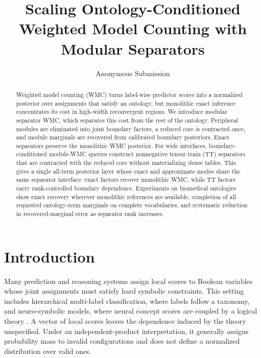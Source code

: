 \documentclass[letterpaper]{article}
\title{Scaling Ontology-Conditioned Weighted Model Counting with Modular Separators}
\author{
    Anonymous Submission
}
\begin{document}
\maketitle

\begin{abstract}
Weighted model counting (WMC) turns label-wise predictor scores into a
normalized posterior over assignments that satisfy an ontology, but
monolithic exact inference concentrates its cost in high-width
reconvergent regions. We introduce modular separator WMC, which separates
this cost from the rest of the ontology. Peripheral modules are eliminated
into joint boundary factors, a reduced core is contracted once, and module
marginals are recovered from calibrated boundary posteriors. Exact
separators preserve the monolithic WMC posterior. For wide interfaces,
boundary-conditioned module-WMC queries construct nonnegative
tensor-train (TT) separators that are contracted with the reduced core
without materializing dense tables. This gives a single all-term posterior
layer whose exact and approximate modes share the same separator interface:
exact factors recover monolithic WMC, while TT factors carry
rank-controlled boundary dependence. Experiments on biomedical ontologies
show exact recovery wherever monolithic references are available,
completion of all requested ontology-term marginals on complete
vocabularies, and systematic reduction in recovered-marginal error as
separator rank increases.
\end{abstract}

\section{Introduction}
\label{sec:intro}

Many prediction and reasoning systems assign local scores to Boolean
variables whose joint assignments must satisfy hard symbolic constraints.
This setting includes hierarchical multi-label classification, where labels
follow a taxonomy, and neuro-symbolic models, where neural concept scores
are coupled by a logical theory
\citep{silla2011survey,giunchiglia2020chmcnn,
xu2018semanticloss,ahmed2022spl}. A vector of local scores leaves the
dependence induced by the theory unspecified. Under an independent-product
interpretation, it generally assigns probability mass to invalid
configurations and does not define a normalized distribution over valid
ones.
\end{document}
